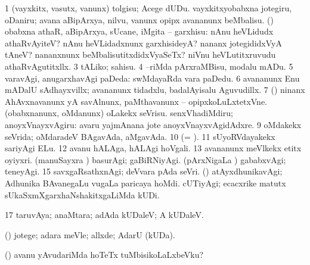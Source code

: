{{{{{{\noindent
\gl{\pagu}
\expl{}
\bmng
\bnum
\num{1}  (vayxkitx, vasutx, \mo vanunx) tolgisu; Acege dUDu. 
  
\banum
{} vayxkitxyobabxna jotegiru, oDaniru; avana aBipArxya, nilvu, \mo vanunx opipx avananunx beMbalisu. 
 (\AmA) obabxna athaR, aBipArxya, sUcane, iMgita -- garxhisu:  nAnu heVLidudx athaRvAyiteV? nAnu heVLidadxnunx garxhisideyA? nananx jotegididxVyA tAneV? nananxnunx beMbalisutitxdidxVyaSeTx?  niVnu heVLutitxruvudu athaRvAgutitxllx. 
\hypertarget{with pagu3}{} 
\eanum
\numie
\num{3}  tALiko; sahisu. 
\num{4}  --riMda pArxraMBisu, modalu mADu. 
\num{5}  varavAgi, anugarxhavAgi paDeda:  swMdayaRda vara paDedu. 
\num{6}  avananunx Enu mADalU sAdhayxvillx; avananunx tidadxlu, badalAyisalu Aguvudillx. 
\num{7}  (\pArxparx) ninanx AhAvxnavanunx yA savAlnunx, paMthavanunx -- opipxkoLuLxtetxVne. 
  
\banum
{} (obabxnanunx, oMdanunx) oLakekx seVrisu. 
 senxVhadiMdiru; anoyxVnayxvAgiru:  avaru yajmAnana jote anoyxVnayxvAgidAdxre. 
\eanum
\numie
\num{9}  oMdakekx seVrida; oMdaradeV BAgavAda, aMgavAda. 
\num{10}  (= \hyperlink{with pagu3}{\pagu {}}). 
\num{11}  sUyoRVdayakekx sariyAgi ELu. 
\num{12}  avanu hALAga, hALAgi hoVgali. 
\num{13}  avananunx meVlkekx etitx oyiyxri. 
  
\banum
{} (manuSayxra \vi) basurAgi; gaBiRNiyAgi. 
 (pArxNigaLa \vi) gababxvAgi; teneyAgi. 
\eanum
\numie
\num{15}  savxgaRsathxnAgi; deVvara pAda seVri. 
  (\AmA) 
\banum
{} atAyxdhunikavAgi; Adhunika BAvanegaLu \mo vugaLa paricaya hoMdi. 
 cUTiyAgi; ecacxrike matutx sUkaSxmXgarxhaNshakitxgaLiMda kUDi. 
\eanum
\numie
\num{17}  taruvAya; anaMtara; adAda kUDaleV; A kUDaleV. 
\enum
\emng
\eentry

\bentry
{} 
\gl{\kirxvi}
\expl{}
\bmng
(\pArxparx) jotege; adara meVle; allxde; AdarU (kUDa). 
\emng
\eentry

\bentry
{} 
\gl{\upa}
\expl{}
\bmng
(\pArxparx)  avanu yAvudariMda hoTeTx tuMbisikoLaLxbeVku? 
\emng
\eentry

}}}}}}
